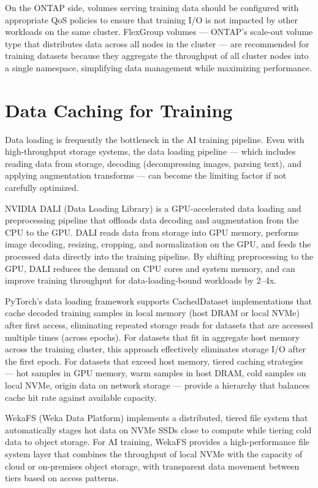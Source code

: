 On the ONTAP side, volumes serving training data should be configured with appropriate QoS policies to ensure that training I/O is not impacted by other workloads on the same cluster. FlexGroup volumes --- ONTAP's scale-out volume type that distributes data across all nodes in the cluster --- are recommended for training datasets because they aggregate the throughput of all cluster nodes into a single namespace, simplifying data management while maximizing performance.

\section{Data Caching for Training}

Data loading is frequently the bottleneck in the AI training pipeline. Even with high-throughput storage systems, the data loading pipeline --- which includes reading data from storage, decoding (decompressing images, parsing text), and applying augmentation transforms --- can become the limiting factor if not carefully optimized.

NVIDIA DALI (Data Loading Library) is a GPU-accelerated data loading and preprocessing pipeline that offloads data decoding and augmentation from the CPU to the GPU. DALI reads data from storage into GPU memory, performs image decoding, resizing, cropping, and normalization on the GPU, and feeds the processed data directly into the training pipeline. By shifting preprocessing to the GPU, DALI reduces the demand on CPU cores and system memory, and can improve training throughput for data-loading-bound workloads by 2--4x.

PyTorch's data loading framework supports CachedDataset implementations that cache decoded training samples in local memory (host DRAM or local NVMe) after first access, eliminating repeated storage reads for datasets that are accessed multiple times (across epochs). For datasets that fit in aggregate host memory across the training cluster, this approach effectively eliminates storage I/O after the first epoch. For datasets that exceed host memory, tiered caching strategies --- hot samples in GPU memory, warm samples in host DRAM, cold samples on local NVMe, origin data on network storage --- provide a hierarchy that balances cache hit rate against available capacity.

WekaFS (Weka Data Platform) implements a distributed, tiered file system that automatically stages hot data on NVMe SSDs close to compute while tiering cold data to object storage. For AI training, WekaFS provides a high-performance file system layer that combines the throughput of local NVMe with the capacity of cloud or on-premises object storage, with transparent data movement between tiers based on access patterns.

